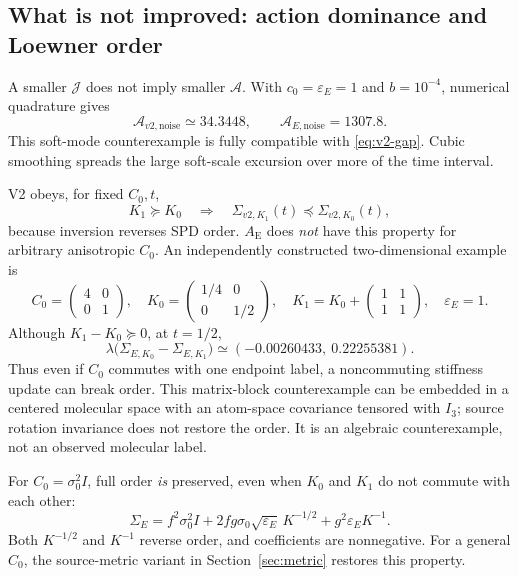 \documentclass[11pt,letterpaper]{article}
\newcommand{\epsE}{\varepsilon_E}
\newcommand{\AltE}{A_{\mathrm E}}
\newcommand{\J}{\mathcal J}
\begin{document}
\subsection{What is not improved: action dominance and Loewner order}
A smaller $\J$ does not imply smaller $\mathcal A$. With $c_0=\epsE=1$ and $b=10^{-4}$, numerical quadrature gives
\begin{equation}
\mathcal A_{v2,\mathrm{noise}}\simeq34.3448,\qquad
\mathcal A_{E,\mathrm{noise}}=1307.8.
\label{eq:soft-counter}
\end{equation}
This soft-mode counterexample is fully compatible with \eqref{eq:v2-gap}. Cubic smoothing spreads the large soft-scale excursion over more of the time interval.

V2 obeys, for fixed $C_0,t$,
\begin{equation}
K_1\succeq K_0\quad\Longrightarrow\quad
\Sigma_{v2,K_1}(t)\preceq\Sigma_{v2,K_0}(t),
\label{eq:v2-order}
\end{equation}
because inversion reverses SPD order. $\AltE$ does \emph{not} have this property for arbitrary anisotropic $C_0$. An independently constructed two-dimensional example is
\begin{equation}
C_0=\begin{pmatrix}4&0\\0&1\end{pmatrix},\quad
K_0=\begin{pmatrix}1/4&0\\0&1/2\end{pmatrix},\quad
K_1=K_0+\begin{pmatrix}1&1\\1&1\end{pmatrix},\quad \epsE=1.
\label{eq:order-example}
\end{equation}
Although $K_1-K_0\succeq0$, at $t=1/2$,
\begin{equation}
\lambda\bigl(\Sigma_{E,K_0}-\Sigma_{E,K_1}\bigr)
\simeq(-0.00260433,\ 0.22255381).
\label{eq:order-failure}
\end{equation}
Thus even if $C_0$ commutes with one endpoint label, a noncommuting stiffness update can break order. This matrix-block counterexample can be embedded in a centered molecular space with an atom-space covariance tensored with $I_3$; source rotation invariance does not restore the order. It is an algebraic counterexample, not an observed molecular label.

For $C_0=\sigma_0^2I$, full order \emph{is} preserved, even when $K_0$ and $K_1$ do not commute with each other:
\begin{equation}
\Sigma_E=f^2\sigma_0^2I+2fg\sigma_0\sqrt{\epsE}\,K^{-1/2}+g^2\epsE K^{-1}.
\label{eq:isotropic-order}
\end{equation}
Both $K^{-1/2}$ and $K^{-1}$ reverse order, and coefficients are nonnegative. For a general $C_0$, the source-metric variant in Section~\ref{sec:metric} restores this property.
\end{document}

